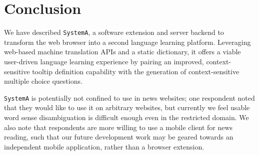 \section{Conclusion}
\label{sec:conclusion}

We have described {\tt SystemA}, a software extension and server
backend to transform the web browser into a second language learning
platform.  Leveraging web-based machine translation APIs and a static
dictionary, it offers a viable user-driven language learning
experience by pairing an improved, context-sensitive tooltip
definition capability with the generation of context-sensitive
multiple choice questions.


{\tt SystemA} is potentially not confined to use in news websites; one
respondent noted that they would like to use it on arbitrary websites,
but currently we feel usable word sense disambiguation is difficult
enough even in the restricted domain.  We also note that respondents
are more willing to use a mobile client for news reading, such that
our future development work may be geared towards an independent
mobile application, rather than a browser extension.
